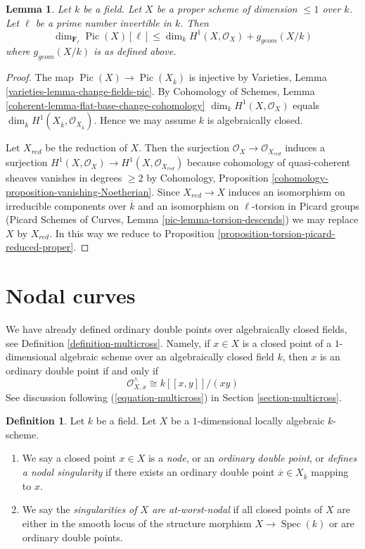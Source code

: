 \documentclass{stacks-project}
\theoremstyle{plain}
\newtheorem{lemma}[subsection]{Lemma}
\theoremstyle{definition}
\newtheorem{definition}[subsection]{Definition}
\theoremstyle{remark}
\numberwithin{equation}{subsection}
\def\Spec{\mathop{\mathrm{Spec}}}
\def\Pic{\mathop{\mathrm{Pic}}\nolimits}
\begin{document}
\begin{lemma}
\label{lemma-bound-torsion-simple}
Let $k$ be a field. Let $X$ be a proper scheme of dimension $\leq 1$ over $k$.
Let $\ell$ be a prime number invertible in $k$. Then
$$
\dim_{\mathbf{F}_\ell} \Pic(X)[\ell] \leq
\dim_k H^1(X, \mathcal{O}_X) + g_{geom}(X/k)
$$
where $g_{geom}(X/k)$ is as defined above.
\end{lemma}

\begin{proof}
The map $\Pic(X) \to \Pic(X_{\overline{k}})$
is injective by Varieties, Lemma \ref{varieties-lemma-change-fields-pic}.
By Cohomology of Schemes, Lemma \ref{coherent-lemma-flat-base-change-cohomology}
$\dim_k H^1(X, \mathcal{O}_X)$ equals
$\dim_{\overline{k}} H^1(X_{\overline{k}}, \mathcal{O}_{X_{\overline{k}}})$.
Hence we may assume $k$ is algebraically closed.

\medskip\noindent
Let $X_{red}$ be the reduction of $X$. Then the surjection
$\mathcal{O}_X \to \mathcal{O}_{X_{red}}$ induces a surjection
$H^1(X, \mathcal{O}_X) \to H^1(X, \mathcal{O}_{X_{red}})$
because cohomology of quasi-coherent sheaves vanishes in degrees
$\geq 2$ by
Cohomology, Proposition \ref{cohomology-proposition-vanishing-Noetherian}.
Since $X_{red} \to X$ induces an isomorphism on irreducible
components over $\overline{k}$ and an isomorphism on
$\ell$-torsion in Picard groups
(Picard Schemes of Curves, Lemma \ref{pic-lemma-torsion-descends})
we may replace $X$ by $X_{red}$. In this way we reduce to
Proposition \ref{proposition-torsion-picard-reduced-proper}.
\end{proof}






\section{Nodal curves}
\label{section-nodal}

\noindent
We have already defined ordinary double points over algebraically
closed fields, see Definition \ref{definition-multicross}. Namely,
if $x \in X$ is a closed point of a $1$-dimensional
algebraic scheme over an algebraically closed field $k$, then
$x$ is an ordinary double point if and only if
$$
\mathcal{O}_{X, x}^\wedge \cong k[[x, y]]/(xy)
$$
See discussion following (\ref{equation-multicross}) in
Section \ref{section-multicross}.

\begin{definition}
\label{definition-nodal}
Let $k$ be a field. Let $X$ be a $1$-dimensional locally algebraic $k$-scheme.
\begin{enumerate}
\item We say a closed point $x \in X$ is a {\it node}, or an
{\it ordinary double point}, or {\it defines a nodal singularity}
if there exists an ordinary double point $\overline{x} \in X_{\overline{k}}$
mapping to $x$.
\item We say the {\it singularities of $X$ are at-worst-nodal} if
all closed points of $X$ are either in the smooth locus of
the structure morphism $X \to \Spec(k)$ or are ordinary double points.
\end{enumerate}
\end{definition}
\end{document}
